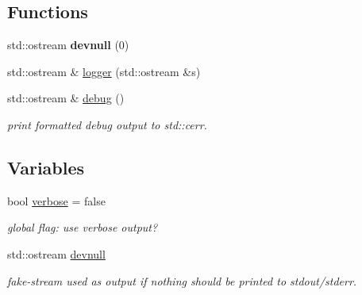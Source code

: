 \subsection*{Functions}
\begin{DoxyCompactItemize}
\item 
\hypertarget{namespaceClustering_acb34e417b17573d2ae71f519f0999243}{std\-::ostream {\bfseries devnull} (0)}\label{namespaceClustering_acb34e417b17573d2ae71f519f0999243}

\item 
std\-::ostream \& \hyperlink{namespaceClustering_a0ead5f9ec5399dfd97de1959952ad27e}{logger} (std\-::ostream \&s)
\item 
\hypertarget{namespaceClustering_a539dad7637e87e271ee24ac3deabdb5f}{std\-::ostream \& \hyperlink{namespaceClustering_a539dad7637e87e271ee24ac3deabdb5f}{debug} ()}\label{namespaceClustering_a539dad7637e87e271ee24ac3deabdb5f}

\begin{DoxyCompactList}\small\item\em print formatted debug output to std\-::cerr. \end{DoxyCompactList}\end{DoxyCompactItemize}
\subsection*{Variables}
\begin{DoxyCompactItemize}
\item 
\hypertarget{namespaceClustering_a2d345c7908fc94461ac1a278bb00ba22}{bool \hyperlink{namespaceClustering_a2d345c7908fc94461ac1a278bb00ba22}{verbose} = false}\label{namespaceClustering_a2d345c7908fc94461ac1a278bb00ba22}

\begin{DoxyCompactList}\small\item\em global flag\-: use verbose output? \end{DoxyCompactList}\item 
\hypertarget{namespaceClustering_a6a1cfe2793536c71c20bd1b35537a9ea}{std\-::ostream \hyperlink{namespaceClustering_a6a1cfe2793536c71c20bd1b35537a9ea}{devnull}}\label{namespaceClustering_a6a1cfe2793536c71c20bd1b35537a9ea}

\begin{DoxyCompactList}\small\item\em fake-\/stream used as output if nothing should be printed to stdout/stderr. \end{DoxyCompactList}\end{DoxyCompactItemize}


